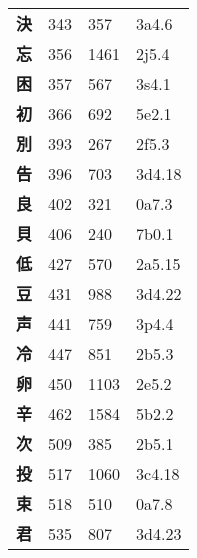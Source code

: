 \begin{longtable}[c]{llll}
    \bfseries 決 & 343 & 357 & 3a4.6\\
    \bfseries 忘 & 356 & 1461 & 2j5.4\\
    \bfseries 困 & 357 & 567 & 3s4.1\\
    \bfseries 初 & 366 & 692 & 5e2.1\\
    \bfseries 別 & 393 & 267 & 2f5.3\\
    \bfseries 告 & 396 & 703 & 3d4.18\\
    \bfseries 良 & 402 & 321 & 0a7.3\\
    \bfseries 貝 & 406 & 240 & 7b0.1\\
    \bfseries 低 & 427 & 570 & 2a5.15\\
    \bfseries 豆 & 431 & 988 & 3d4.22\\
    \bfseries 声 & 441 & 759 & 3p4.4\\
    \bfseries 冷 & 447 & 851 & 2b5.3\\
    \bfseries 卵 & 450 & 1103 & 2e5.2\\
    \bfseries 辛 & 462 & 1584 & 5b2.2\\
    \bfseries 次 & 509 & 385 & 2b5.1\\
    \bfseries 投 & 517 & 1060 & 3c4.18\\
    \bfseries 束 & 518 & 510 & 0a7.8\\
    \bfseries 君 & 535 & 807 & 3d4.23\\
  \end{longtable}
